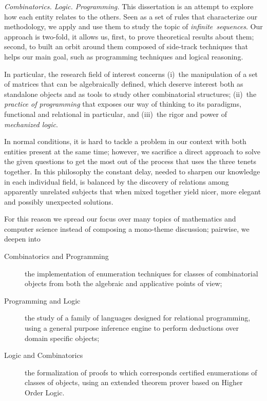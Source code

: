 


\textit{Combinatorics. Logic. Programming.} This dissertation is an attempt to
explore how each entity relates to the others. Seen as a set of rules that
characterize our methodology, we apply and use them to study the topic of
\textit{infinite~sequences}.  Our approach is two-fold, it allows us, first, to
prove theoretical results about them; second, to built an orbit around them
composed of side-track techniques that helps our main goal, such as programming
techniques and logical reasoning.

In particular, the research field of interest concerns (i)~the manipulation of
a set of matrices that can be algebraically defined, which deserve interest
both as standalone objects and as tools to study other combinatorial
structures; (ii)~the \textit{practice of programming} that exposes our way of
thinking to its paradigms, functional and relational in particular, and
(iii)~the rigor and power of \textit{mechanized logic}.

In normal conditions, it is hard to tackle a problem in our context with both
entities present at the same time; however, we sacrifice a direct approach to
solve the given questions to get the most out of the process that uses the
three tenets together. In this philosophy the constant delay, needed to sharpen
our knowledge in each individual field, is balanced by the discovery of
relations among apparently unrelated subjects that when mixed together yield
nicer, more elegant and possibly unexpected solutions.

For this reason we spread our focus over many topics of mathematics and
computer science instead of composing a mono-theme discussion; pairwise,
we deepen into
\begin{description}

    \item[Combinatorics and Programming] the implementation of enumeration
    techniques for classes of combinatorial objects from both the algebraic
    and applicative points of view;

    \item[Programming and Logic] the study of a family of languages designed
    for relational programming, using a general purpose inference engine to
    perform deductions over domain specific objects;

    \item[Logic and Combinatorics] the formalization of proofs to which
    corresponds certified enumerations of classes of objects, using an extended
    theorem prover based on Higher Order Logic.

\end{description}

